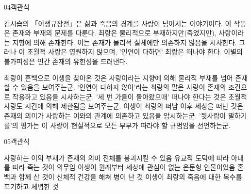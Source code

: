 \documentclass[fs85,seriesWit]{korfarm-base}
\begin{document}
\begin{kfQBlock}{04}{객관식}
\begin{kfEvidence}김시습의 「이생규장전」은 삶과 죽음의 경계를 사랑이 넘어서는 이야기이다. 이 작품은 존재와 부재의 문제를 다룬다. 최랑은 물리적으로 부재하지만(죽었지만), 사랑이라는 지향에 의해 존재한다. 이는 존재가 물리적 실체에만 의존하지 않음을 시사한다. 그러나 이 초월적 사랑은 영원하지 않으며, '인연이 다하면' 최랑은 떠나야 한다. 이별의 불가피성은 인간 존재의 유한성을 드러낸다.\end{kfEvidence}
\begin{kfChoices}
\kfChoice 최랑이 혼백으로 이생을 찾아온 것은 사랑이라는 지향에 의해 물리적 부재를 넘어 존재할 수 있음을 보여주는군.
\kfChoice '인연이 다하지 않아'라는 최랑의 말은 사랑이 존재의 조건으로 작용하고 있음을 시사하는군.
\kfChoice '세 번 가을이 돌아왔으매' 떠나야 한다는 것은 초월적 사랑도 시간에 의해 제한됨을 보여주는군.
\kfChoice 이생이 최랑의 떠남 이후 세상을 떠난 것은 존재의 의미가 사랑하는 이와의 관계에 의존하고 있음을 암시하는군.
\kfChoice '뒷사람이 말하기를'의 평가는 이 사랑이 현실적으로 모든 부부가 따라야 할 규범임을 선언하는군.
\end{kfChoices}
\end{kfQBlock}

\begin{kfQBlock}{05}{객관식}
\begin{kfChoices}
\kfChoice 사랑하는 이의 부재가 존재의 의미 전체를 붕괴시킬 수 있음
\kfChoice 유교적 도덕에 따라 아내를 따라 죽는 것이 의무임
\kfChoice 이생이 원래부터 세상에 관심이 없는 은둔형 인물이었음
\kfChoice 혼백과 함께 산 것이 신체적 건강을 해쳐 병이 난 것
\kfChoice 이생이 최랑의 죽음에 대한 복수를 포기하고 체념한 것
\end{kfChoices}
\end{kfQBlock}

\kfEndMC

\end{document}

